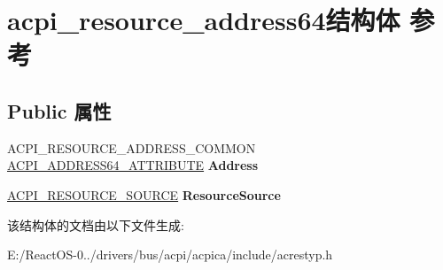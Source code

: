 \hypertarget{structacpi__resource__address64}{}\section{acpi\+\_\+resource\+\_\+address64结构体 参考}
\label{structacpi__resource__address64}
\subsection*{Public 属性}
\begin{DoxyCompactItemize}
\item 
\mbox{\label{structacpi__resource__address64_a317830a066edabfc4a3ea1e4937987a1}} 
A\+C\+P\+I\+\_\+\+R\+E\+S\+O\+U\+R\+C\+E\+\_\+\+A\+D\+D\+R\+E\+S\+S\+\_\+\+C\+O\+M\+M\+ON \hyperlink{structacpi__address64__attribute}{A\+C\+P\+I\+\_\+\+A\+D\+D\+R\+E\+S\+S64\+\_\+\+A\+T\+T\+R\+I\+B\+U\+TE} {\bfseries Address}
\item 
\mbox{\label{structacpi__resource__address64_a964900e45c2178daf118148636978438}} 
\hyperlink{structacpi__resource__source}{A\+C\+P\+I\+\_\+\+R\+E\+S\+O\+U\+R\+C\+E\+\_\+\+S\+O\+U\+R\+CE} {\bfseries Resource\+Source}
\end{DoxyCompactItemize}


该结构体的文档由以下文件生成\+:\begin{DoxyCompactItemize}
\item 
E\+:/\+React\+O\+S-\/0../drivers/bus/acpi/acpica/include/acrestyp.\+h\end{DoxyCompactItemize}
